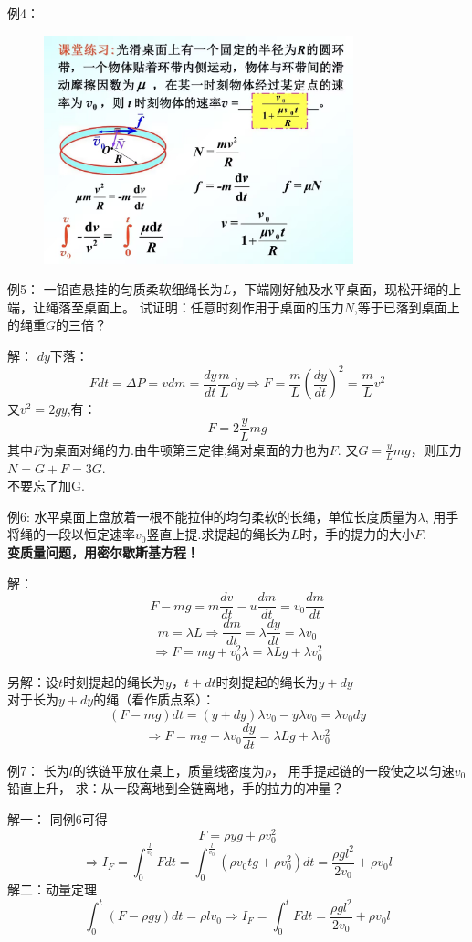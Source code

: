 \documentclass[10pt,a4paper]{article}
\begin{document}
例4：
\begin{figure}[h]
    \centering
    \includegraphics[width=0.8\textwidth]{eg4.jpg}
    \end{figure}
\newpage
例5：
一铅直悬挂的匀质柔软细绳长为$L$，下端刚好触及水平桌面，现松开绳的上端，让绳落至桌面上。
试证明：任意时刻作用于桌面的压力$N$,等于已落到桌面上的绳重$G$的三倍？

\noindent 解：
$dy$下落：
\[Fdt=\Delta P=vdm=\frac{dy}{dt}\frac{m}{L}dy
\Rightarrow
F=\frac{m}{L}(\frac{dy}{dt})^2=\frac{m}{L}v^2
\]
又$v^2=2gy$,有：
\[F=2\frac{y}{L}mg\]
其中$F$为桌面对绳的力.由牛顿第三定律,绳对桌面的力也为$F$.
又$G=\frac{y}{L}mg$，则压力$N=G+F=3G$.\\
不要忘了加G.

例6:
水平桌面上盘放着一根不能拉伸的均匀柔软的长绳，单位长度质量为$\lambda$,
用手将绳的一段以恒定速率$v_0$竖直上提.求提起的绳长为$L$时，手的提力的大小$F$.
\\\textbf{变质量问题，用密尔歇斯基方程！}

\noindent 解：
\[
F-mg=m\frac{dv}{dt}-u\frac{dm}{dt}=v_0\frac{dm}{dt}\]
\[m=\lambda L\Rightarrow \frac{dm}{dt}=\lambda \frac{dy}{dt}=\lambda v_0\]
\[\Rightarrow F=mg+v_0^2 \lambda=\lambda Lg+\lambda v_0^2\]

\noindent 另解：设$t$时刻提起的绳长为$y$，$t+dt$时刻提起的绳长为$y+dy$\\
对于长为$y+dy$的绳（看作质点系）：
\[(F-mg)dt=(y+dy)\lambda v_0-y\lambda v_0=\lambda v_0dy\]
\[\Rightarrow F=mg+\lambda v_0\frac{dy}{dt}=\lambda Lg+\lambda v_0^2\]

例7：
长为$l$的铁链平放在桌上，质量线密度为$\rho$，
用手提起链的一段使之以匀速$v_0$铅直上升，
求：从一段离地到全链离地，手的拉力的冲量？

\noindent 解一：
同例6可得\[F=\rho yg+\rho v_0^2\]
\[\Rightarrow I_F=\int_0^{\frac{l}{v_0}}Fdt
=\int_0^{\frac{l}{v_0}}(\rho v_0tg+\rho v_0^2)dt
=\frac{\rho gl^2}{2v_0}+\rho v_0l\]
\noindent 解二：动量定理
\[\int_0^t(F-\rho gy)dt=\rho lv_0
\Rightarrow I_F=\int_0^tFdt=\frac{\rho gl^2}{2v_0}+\rho v_0l\]
\end{document}
